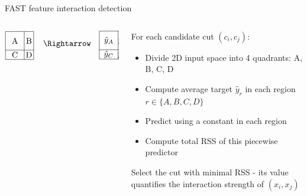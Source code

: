 \documentclass[11pt,compress,t,notes=noshow, aspectratio=169, xcolor=table]{beamer}
\begin{document}
\begin{frame}{FAST feature interaction detection}
\begin{columns}[c, totalwidth=\textwidth]
\begin{column}{0.45\textwidth}
\[\begin{array}{@{}l@{\quad}l@{\quad}l@{\quad}l@{\quad}l}
    \begin{tikzpicture}[baseline=(current bounding box.center)]
        \draw (0,0) rectangle (1.2,1.2);
        \draw (0.8,0) -- (0.8,1.2); 
        \draw (0,0.4) -- (1.2,0.4); 
        \node at (0.4,0.2) {C};
        \node at (1,0.2) {D};
        \node at (0.4,0.8) {A};
        \node at (1,0.8) {B};
    \end{tikzpicture} & \text{$\Rightarrow$} & \begin{tikzpicture}[baseline=(current bounding box.center)]
        \draw (0,0) rectangle (1.2,1.2);
        \draw (0.8,0) -- (0.8,1.2); 
        \draw (0,0.4) -- (1.2,0.4); 
        \node at (0.4,0.2) {$\hat{y}_C$};
        \node at (1,0.2) {$\hat{y}_D$};
        \node at (0.4,0.8) {$\hat{y}_A$};
        \node at (1,0.8) {$\hat{y}_B$};
    \end{tikzpicture} & \text{$\Rightarrow$} & \text{$RSS_{N}$}\\ 
\end{array}
\]
    \end{column}
        \begin{column}{0.53\textwidth}
        For each candidate cut $(c_i, c_j)$:
  \begin{itemize}
    \item Divide 2D input space into 4 quadrants: A, B, C, D
    \item Compute average target $\hat{y}_r$ in each region $r \in \{A, B, C, D\}$
    \item Predict using a constant in each region
    \item Compute total RSS of this piecewise predictor
  \end{itemize}
Select the cut with minimal RSS - its value quantifies the interaction strength of $(x_i, x_j)$

    \end{column}
\end{columns}


\end{frame}


\end{document}
